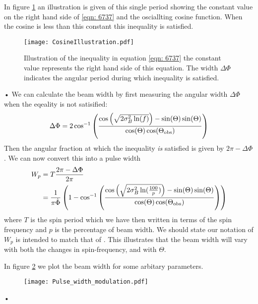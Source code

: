 \documentclass[/home/greg/Thesis/main/main.tex]{subfiles}
\begin{document}
In figure \ref{fig: CosineIllustration} an illustration is given of this single
period showing the constant value on the right hand side of \eqref{eqn: 6737} and
the osciallting cosine function. When the cosine is less than this constant
this inequality is satisfied.
\begin{figure}[ht]
\centering
\texttt{[image: CosineIllustration.pdf]}
\caption{Illustration of the inequality in equation \eqref{eqn: 6737} the constant
         value represents the right hand side of this equation. The  
         width $\Delta\Phi$ indicates the angular period during which inequality
         is satisfied.}
\label{fig: CosineIllustration}
\end{figure}•
We can calculate the beam width by first measuring the angular width $\Delta\Phi$
when the eqeality is not satisified:
\begin{equation}
    \Delta\Phi = 2\cos^{-1}\left(
                \frac{\cos\left(\sqrt{2\sigma_{B}^{2} \ln(f)}\right) - \sin(\Theta)\sin(\Theta)}
                          {\cos(\Theta)\cos(\Theta_{\mathrm{obs}})}
                      \right)
\end{equation}
Then the angular fraction at which the inequality \emph{is} satisfied is given by 
$2\pi - \Delta\Phi$. We can now convert this into a pulse width
\begin{align}
    W_{p} & = T \frac{2\pi - \Delta\Phi}{2\pi}\\
          & = \frac{1}{\pi \dot{\Phi}}\left(1 - 
               \cos^{-1}\left(
                   \frac{\cos\left(\sqrt{2\sigma_{B}^{2} \ln(\frac{100}{p})}\right) - \sin(\Theta)\sin(\Theta)}
                          {\cos(\Theta)\cos(\Theta_{\mathrm{obs}})}
                      \right)
                  \right)
\label{eqn: Wp}
\end{align}
where $T$ is the spin period which we have then written in terms of the spin
frequency and $p$ is the percentage of beam width. We should state our notation
of $W_{p}$ is intended to match that of \citet{Lyne2010}. This illustrates that
the beam width will vary with both the changes in spin-frequency, and with
$\Theta$.

In figure \ref{fig: Pulse width modulation} we plot the beam width for some
arbitary parameters.
\begin{figure}[ht]
\centering
\texttt{[image: Pulse\_width\_modulation.pdf]}
\caption{}
\label{fig: Pulse width modulation}
\end{figure}•
\end{document}

